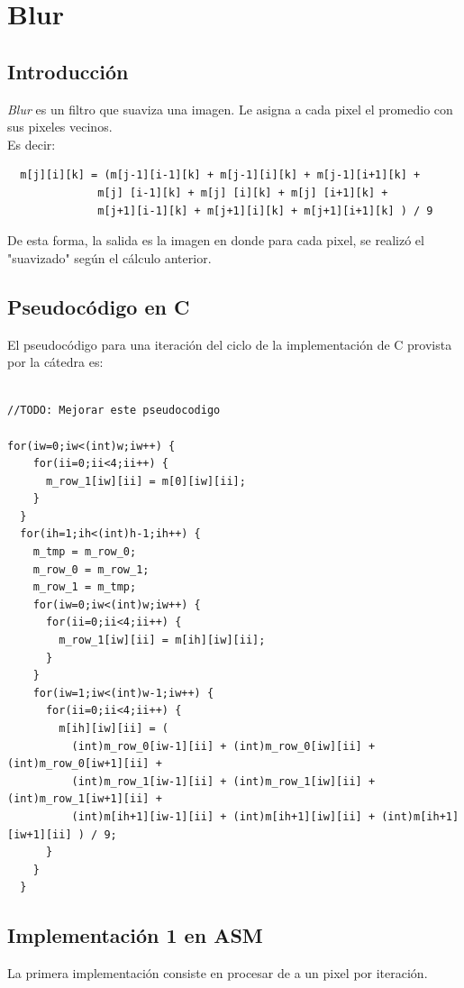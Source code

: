 \section{Blur}
\subsection{Introducción}
\textit{Blur} es un filtro que suaviza una imagen. Le asigna a cada pixel el promedio con sus pixeles vecinos.\\ Es decir:

\begin{verbatim}
  m[j][i][k] = (m[j-1][i-1][k] + m[j-1][i][k] + m[j-1][i+1][k] + 
              m[j] [i-1][k] + m[j] [i][k] + m[j] [i+1][k] + 
              m[j+1][i-1][k] + m[j+1][i][k] + m[j+1][i+1][k] ) / 9
\end{verbatim}

De esta forma, la salida es la imagen en donde para cada pixel, se realizó el "suavizado" según el cálculo anterior.

\subsection{Pseudocódigo en C}

El pseudocódigo para una iteración del ciclo de la implementación de C provista por la cátedra es:

\begin{lstlisting}

//TODO: Mejorar este pseudocodigo

for(iw=0;iw<(int)w;iw++) {
    for(ii=0;ii<4;ii++) {
      m_row_1[iw][ii] = m[0][iw][ii];
    }
  }
  for(ih=1;ih<(int)h-1;ih++) {
    m_tmp = m_row_0;
    m_row_0 = m_row_1;
    m_row_1 = m_tmp;
    for(iw=0;iw<(int)w;iw++) {
      for(ii=0;ii<4;ii++) {
        m_row_1[iw][ii] = m[ih][iw][ii];
      }
    }
    for(iw=1;iw<(int)w-1;iw++) {
      for(ii=0;ii<4;ii++) {
        m[ih][iw][ii] = ( 
          (int)m_row_0[iw-1][ii] + (int)m_row_0[iw][ii] + (int)m_row_0[iw+1][ii] +
          (int)m_row_1[iw-1][ii] + (int)m_row_1[iw][ii] + (int)m_row_1[iw+1][ii] +
          (int)m[ih+1][iw-1][ii] + (int)m[ih+1][iw][ii] + (int)m[ih+1][iw+1][ii] ) / 9;
      }
    }
  }

\end{lstlisting}

\subsection{Implementación 1 en ASM}
La primera implementación consiste en procesar de a un pixel por iteración.\\

